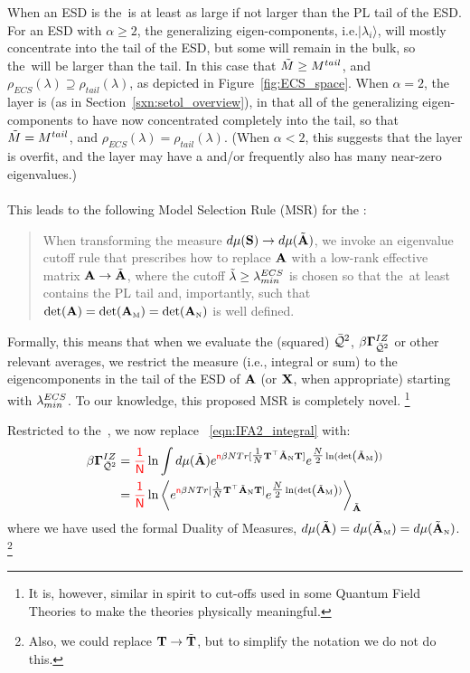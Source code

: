When an ESD is \emph{\FatTailed} the~\ECS is at least as large if not larger than the PL tail of the ESD.
For an ESD with $\alpha\ge 2$, the generalizing eigen-components, i.e.$|\lambda_{i}\rangle$, will mostly
concentrate into the tail of the ESD, but some will remain in the bulk, so
the~\ECS will be larger than the tail.
In this case that $\tilde{M}\ge M^{tail}$,
and
$\rho_{ECS}(\lambda)\supseteq\rho_{tail}(\lambda)$, as depicted in Figure~\ref{fig:ECS_space}.
When $\alpha=2$,  the layer is \Ideal (as in Section~\ref{sxn:setol_overview}),
in that all of the generalizing eigen-components to have now concentrated completely into the tail, so that
 $\tilde{M}=M^{tail}$,
and
$\rho_{ECS}(\lambda)=\rho_{tail}(\lambda)$.
(When $\alpha< 2$, this suggests that the layer is overfit, and the layer may have a \CorrelationTrap and/or
frequently also has many near-zero eigenvalues.)
\\
\\
This leads to the following Model Selection Rule (MSR) for the \ECS:
\begin{quote}
  When transforming the measure $d\mu({\mathbf{S}}) \rightarrow d\mu(\tilde{\mathbf{A}})$, we invoke an eigenvalue cutoff rule that
  prescribes how to replace $\mathbf{A}$ with a low-rank effective matrix $\mathbf{A}\rightarrow\tilde{\mathbf{A}}$,
  where the cutoff $\tilde{\lambda}\ge\lambda^{ECS}_{min}$ is chosen so that the~\ECS at least contains the PL tail
  and, importantly, such that $\det(\mathbf{A})=\det({\mathbf{A}}_{\text{\tiny M}})=\det({\mathbf{A}}_{\text{\tiny N}})$ is well defined.  
\end{quote}
Formally, this means that when we evaluate the \Quality (squared) $\bar{\mathcal{Q}}^{2}$, \GeneratingFunction $\beta\mathbf{\Gamma}^{IZ}_{\bar{\mathcal{Q}}^{2}}$
or other relevant averages, we restrict the measure (i.e., integral or sum) to the eigencomponents in the tail of the ESD of
$\mathbf{A}$ (or $\mathbf{X}$, when appropriate)
starting with $\lambda^{ECS}_{min}$.  
To our knowledge, this proposed MSR is completely novel.%
\footnote{It is, however, similar in spirit to cut-offs used in some Quantum Field Theories to make the theories physically meaningful.}

Restricted to the~\ECS, we now replace \EQN~\ref{eqn:IFA2_integral} with:
\begin{align}
  \nonumber 
  \beta\mathbf{\Gamma}^{IZ}_{\bar{\mathcal{Q}}^{2}} 
  &=
    {\color{red}\sf{\frac{1}{N}}}
  \ln \int d\mu(\tilde{\mathbf{A}})
  e^{{\color{red}\sf{n}}\beta N Tr[\tfrac{1}{N}{\mathbf{T}}^{\top}\tilde{\mathbf{A}}_{\text{\tiny N}}{\mathbf{T}}] }
  e^{\tfrac{N}{2}\ln(\mbox{}{\text{det}}\left(\tilde{\mathbf{A}}_{\text{\tiny M}}\right))} \\
  \label{eqn:IFA2_braket}
  & =
    {\color{red}\sf{\frac{1}{N}}}
  \ln
  \left\langle
  e^{{\color{red}\sf{n}}\beta N Tr[\tfrac{1}{N}{\mathbf{T}}^{\top}\tilde{\mathbf{A}}_{\text{\tiny N}}{\mathbf{T}}] }
  e^{\tfrac{N}{2}\ln(\mbox{}{\text{det}}\left(\tilde{\mathbf{A}}_{\text{\tiny M}}\right))}
    \right\rangle_{\tilde{\mathbf{A}}}
\end{align}
where we have used the formal Duality of Measures, $d\mu(\tilde{\mathbf{A}})=d\mu(\tilde{\mathbf{A}}_{\text{\tiny M}})=d\mu(\tilde{\mathbf{A}}_{\text{\tiny N}})$.
\footnote{Also, we could replace ${\mathbf{T}}\rightarrow\tilde{\mathbf{T}}$, but to simplify the notation we do not do this.}

